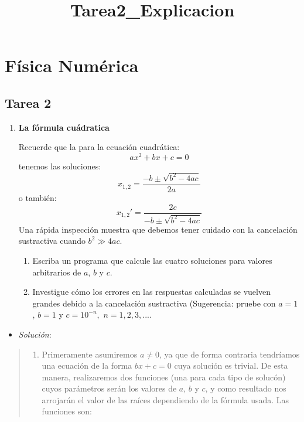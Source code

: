 \documentclass[9pt]{article}
\title{Tarea2\_Explicacion}
\providecommand{\tightlist}{%
      \setlength{\itemsep}{0pt}\setlength{\parskip}{0pt}}
\begin{document}
    
    \maketitle
    
    

    
    \hypertarget{fuxedsica-numuxe9rica}{%
\section{Física Numérica}\label{fuxedsica-numuxe9rica}}

    \hypertarget{tarea-2}{%
\subsection{Tarea 2}\label{tarea-2}}

    \begin{enumerate}
\def\labelenumi{\arabic{enumi}.}
\item
  \textbf{La fórmula cuádratica}

  Recuerde que la para la ecuación cuadrática: \[ax^2 + bx + c = 0\]
  tenemos las soluciones:
  \[x_{1,2} = \dfrac{-b \pm \sqrt{b^2 - 4ac}}{2a}  \tag{1} \] o también:
  \[x_{1,2}' = \dfrac{2c}{-b \pm \sqrt{b^2 - 4ac}} \tag{2}  \] Una
  rápida inspección muestra que debemos tener cuidado con la cancelación
  sustractiva cuando \(b^2 \gg 4ac\).

  \begin{enumerate}
  \def\labelenumii{(\alph{enumii})}
  \tightlist
  \item
    Escriba un programa que calcule las cuatro soluciones para valores
    arbitrarios de \(a\), \(b\) y \(c\).
  \item
    Investigue cómo los errores en las respuestas calculadas se vuelven
    grandes debido a la cancelación sustractiva (Sugerencia: pruebe con
    \(a = 1\), \(b = 1\) y \(c = 10^{-n},\,\,n = 1,2,3,...\).
  \end{enumerate}
\end{enumerate}

    \begin{itemize}
\tightlist
\item
  \emph{Solución}:
\end{itemize}

\begin{quote}
\begin{enumerate}
\def\labelenumi{(\alph{enumi})}
\tightlist
\item
  Primeramente asumiremos \(a\neq 0\), ya que de forma contraria
  tendríamos una ecuación de la forma \(bx+c=0\) cuya solución es
  trivial. De esta manera, realizaremos dos funciones (una para cada
  tipo de solucón) cuyos parámetros serán los valores de \(a\), \(b\) y
  \(c\), y como resultado nos arrojarán el valor de las raíces
  dependiendo de la fórmula usada. Las funciones son:
\end{enumerate}
\end{quote}
\end{document}
